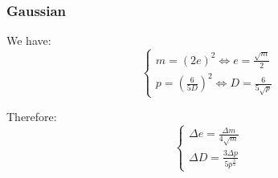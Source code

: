 \documentclass[12pt]{article}
\begin{document}
\subsubsection{Gaussian}

We have:
\begin{equation}
    \begin{cases}
        m = (2e)^2 \Leftrightarrow e = \frac{\sqrt{m}}{2} \\
        p = (\frac{6}{5D})^2 \Leftrightarrow D = \frac{6}{5\sqrt{p}}
    \end{cases}
\end{equation}

Therefore: 
\begin{equation}
    \begin{cases}
        \Delta e = \frac{\Delta m}{4 \sqrt{m}} \\
        \Delta D = \frac{3 \Delta p}{5 p^{\frac{3}{2}}}
    \end{cases}
\end{equation}

\printbibliography
\end{document}
